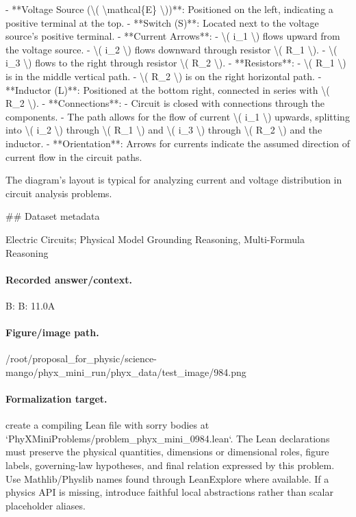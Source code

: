 - **Voltage Source (\textbackslash{}( \textbackslash{}mathcal\{E\} \textbackslash{}))**: Positioned on the left, indicating a positive terminal at the top.
- **Switch (S)**: Located next to the voltage source's positive terminal.
- **Current Arrows**: 
  - \textbackslash{}( i\_1 \textbackslash{}) flows upward from the voltage source.
  - \textbackslash{}( i\_2 \textbackslash{}) flows downward through resistor \textbackslash{}( R\_1 \textbackslash{}).
  - \textbackslash{}( i\_3 \textbackslash{}) flows to the right through resistor \textbackslash{}( R\_2 \textbackslash{}).
- **Resistors**:
  - \textbackslash{}( R\_1 \textbackslash{}) is in the middle vertical path.
  - \textbackslash{}( R\_2 \textbackslash{}) is on the right horizontal path.
- **Inductor (L)**: Positioned at the bottom right, connected in series with \textbackslash{}( R\_2 \textbackslash{}).
- **Connections**: 
  - Circuit is closed with connections through the components.
  - The path allows for the flow of current \textbackslash{}( i\_1 \textbackslash{}) upwards, splitting into \textbackslash{}( i\_2 \textbackslash{}) through \textbackslash{}( R\_1 \textbackslash{}) and \textbackslash{}( i\_3 \textbackslash{}) through \textbackslash{}( R\_2 \textbackslash{}) and the inductor.
- **Orientation**: Arrows for currents indicate the assumed direction of current flow in the circuit paths.

The diagram’s layout is typical for analyzing current and voltage distribution in circuit analysis problems.

\#\# Dataset metadata

Electric Circuits; Physical Model Grounding Reasoning, Multi-Formula Reasoning

\paragraph{Recorded answer/context.}
B: B: 11.0A

\paragraph{Figure/image path.}
/root/proposal\_for\_physic/science-mango/phyx\_mini\_run/phyx\_data/test\_image/984.png

\paragraph{Formalization target.}
create a compiling Lean file with sorry bodies at `PhyXMiniProblems/problem\_phyx\_mini\_0984.lean`. The Lean declarations must preserve the physical quantities, dimensions or dimensional roles, figure labels, governing-law hypotheses, and final relation expressed by this problem.
Use Mathlib/Physlib names found through LeanExplore where available. If a physics API is missing, introduce faithful local abstractions rather than scalar placeholder aliases.

